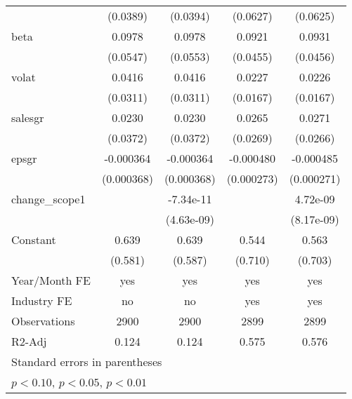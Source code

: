 \begin{table}[htbp]
\begin{tabular}{l*{4}{c}}
                    &    (0.0389)         &    (0.0394)         &    (0.0627)         &    (0.0625)         \\
[1em]
beta                &      0.0978\sym{*}  &      0.0978\sym{*}  &      0.0921\sym{**} &      0.0931\sym{**} \\
                    &    (0.0547)         &    (0.0553)         &    (0.0455)         &    (0.0456)         \\
[1em]
volat               &      0.0416         &      0.0416         &      0.0227         &      0.0226         \\
                    &    (0.0311)         &    (0.0311)         &    (0.0167)         &    (0.0167)         \\
[1em]
salesgr             &      0.0230         &      0.0230         &      0.0265         &      0.0271         \\
                    &    (0.0372)         &    (0.0372)         &    (0.0269)         &    (0.0266)         \\
[1em]
epsgr               &   -0.000364         &   -0.000364         &   -0.000480\sym{*}  &   -0.000485\sym{*}  \\
                    &  (0.000368)         &  (0.000368)         &  (0.000273)         &  (0.000271)         \\
[1em]
change\_scope1       &                     &   -7.34e-11         &                     &    4.72e-09         \\
                    &                     &  (4.63e-09)         &                     &  (8.17e-09)         \\
[1em]
Constant            &       0.639         &       0.639         &       0.544         &       0.563         \\
                    &     (0.581)         &     (0.587)         &     (0.710)         &     (0.703)         \\
\hline
Year/Month FE       &         yes         &         yes         &         yes         &         yes         \\
Industry FE         &          no         &          no         &         yes         &         yes         \\
Observations        &        2900         &        2900         &        2899         &        2899         \\
R2-Adj              &       0.124         &       0.124         &       0.575         &       0.576         \\
\hline\hline
\multicolumn{5}{l}{\footnotesize Standard errors in parentheses}\\
\multicolumn{5}{l}{\footnotesize \sym{*} \(p<0.10\), \sym{**} \(p<0.05\), \sym{***} \(p<0.01\)}\\
\end{tabular}
\end{table}
